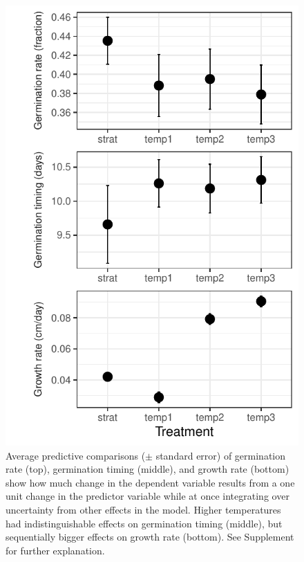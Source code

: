 \documentclass[11pt]{article}\usepackage[]{graphicx}\usepackage[]{color}
\begin{document}
\begin{figure}
	\begin{center}
	\includegraphics[width=.8\textwidth]{apc_fig.pdf}
	\caption{Average predictive comparisons ($\pm$ standard error) of germination rate (top), germination timing (middle), and growth rate (bottom) show how much change in the dependent variable results from a one unit change in the predictor variable while at once integrating over uncertainty from other effects in the model. Higher temperatures had indistinguishable effects on germination timing (middle), but sequentially bigger effects on growth rate (bottom). See Supplement for further explanation.}
\label{fig:apc}
\end{center}
\end{figure}

\end{document}

